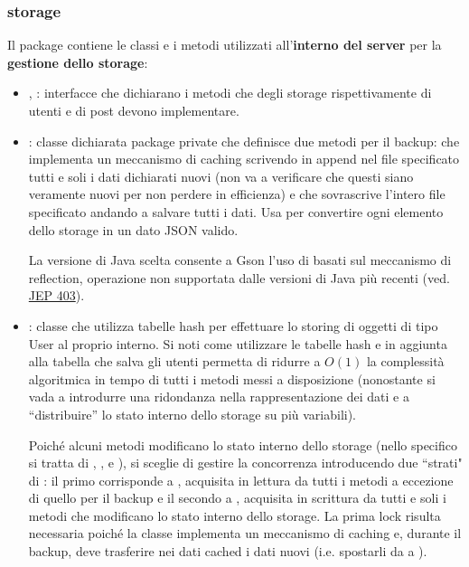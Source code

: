 \documentclass[11pt, italian, openany]{book}
\begin{document}
\begin{sloppypar}
\subsubsection*{storage}
Il package contiene le classi e i metodi utilizzati all'\textbf{interno del server} per la \textbf{gestione dello storage}:
\begin{itemize}[itemsep=0pt, parsep=0pt, topsep=0pt]
	\item {}, : interfacce che dichiarano i metodi che degli storage rispettivamente di utenti
	e di post devono implementare.
	\item {}: classe dichiarata package private che definisce due metodi per il backup:  che
	implementa un meccanismo di caching scrivendo in append nel file specificato tutti e soli i dati dichiarati nuovi (non va a verificare
	che questi siano veramente nuovi per non perdere in efficienza) e  che sovrascrive l'intero file specificato
	andando a salvare tutti i dati. Usa  per convertire ogni elemento dello storage in un dato JSON valido.

	La versione di Java scelta consente a Gson l'uso di  basati sul meccanismo di reflection, operazione non supportata
	dalle versioni di Java pi\`u recenti (ved. \href{https://openjdk.java.net/jeps/403}{JEP 403}).
	\item {}: classe che utilizza tabelle hash per effettuare lo storing di oggetti di tipo User al proprio interno.
	Si noti come utilizzare le tabelle hash  e  in aggiunta alla tabella che salva gli utenti
	permetta di ridurre a \(O(1)\) la complessit\`a algoritmica in tempo di tutti i metodi messi a disposizione (nonostante si vada
	a introdurre una ridondanza nella rappresentazione dei dati e a ``distribuire'' lo stato interno dello storage su pi\`u variabili).

	Poich\'e alcuni metodi modificano lo stato interno dello storage (nello specifico si tratta di ,
	,  e ), si sceglie di gestire la concorrenza introducendo due
	``strati" di : il primo corrisponde a , acquisita in lettura da tutti
	i metodi a eccezione di quello per il backup e il secondo a , acquisita in scrittura da tutti e soli i metodi che
	modificano lo stato interno dello storage. La prima lock risulta necessaria poich\'e la classe implementa un meccanismo di caching e,
	durante il backup, deve trasferire nei dati cached i dati nuovi (i.e. spostarli da  a ).


\end{itemize}
\end{sloppypar}
\end{document}

